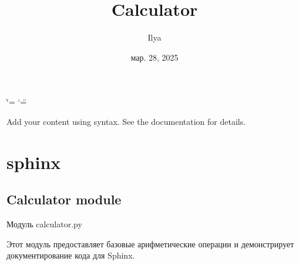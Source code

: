 \documentclass[letterpaper,10pt,russian]{sphinxmanual}
\title{Calculator}
\date{мар. 28, 2025}
\author{Ilya}
\begin{document}
\ifdefined\shorthandoff
  \ifnum\catcode`\=\string=\active\shorthandoff{=}\fi
  \ifnum\catcode`\"=\active{}\fi
\fi

\pagestyle{empty}
\sphinxmaketitle
\pagestyle{plain}
\sphinxtableofcontents
\pagestyle{normal}
\label{\detokenize{index::doc}}


\sphinxAtStartPar
Add your content using  syntax. See the
documentation for details.

\sphinxstepscope


\chapter{sphinx}
\label{\detokenize{modules:sphinx}}\label{\detokenize{modules::doc}}
\sphinxstepscope


\section{Calculator module}
\label{\detokenize{Calculator:module-Calculator}}\label{\detokenize{Calculator:calculator-module}}\label{\detokenize{Calculator::doc}}
\sphinxAtStartPar
Модуль calculator.py

\sphinxAtStartPar
Этот модуль предоставляет базовые арифметические операции и демонстрирует
документирование кода для Sphinx.
\end{document}
